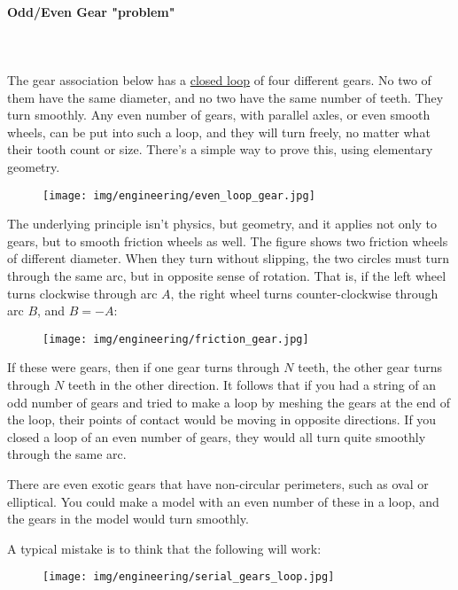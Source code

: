 	\paragraph{Odd/Even Gear "problem"}\mbox{}\\\\
	The gear association below has a \underline{closed loop} of four different gears. No two of them have the same diameter, and no two have the same number of teeth. They turn smoothly. Any even number of gears, with parallel axles, or even smooth wheels, can be put into such a loop, and they will turn freely, no matter what their tooth count or size. There's a simple way to prove this, using elementary geometry.
	\begin{figure}[H]
		\begin{center}
			\texttt{[image: img/engineering/even\_loop\_gear.jpg]}
		\end{center}	
	\end{figure}
	The underlying principle isn't physics, but geometry, and it applies not only to gears, but to smooth friction wheels as well. The figure shows two friction wheels of different diameter. When they turn without slipping, the two circles must turn through the same arc, but in opposite sense of rotation. That is, if the left wheel turns clockwise through arc $A$, the right wheel turns counter-clockwise through arc $B$, and $B = - A$:
	\begin{figure}[H]
		\begin{center}
			\texttt{[image: img/engineering/friction\_gear.jpg]}
		\end{center}	
	\end{figure}
	If these were gears, then if one gear turns through $N$ teeth, the other gear turns through $N$ teeth in the other direction. It follows that if you had a string of an odd number of gears and tried to make a loop by meshing the gears at the end of the loop, their points of contact would be moving in opposite directions. If you closed a loop of an even number of gears, they would all turn quite smoothly through the same arc.
	
	There are even exotic gears that have non-circular perimeters, such as oval or elliptical. You could make a model with an even number of these in a loop, and the gears in the model would turn smoothly.
	
	A typical mistake is to think that the following will work:
	\begin{figure}[H]
		\begin{center}
			\texttt{[image: img/engineering/serial\_gears\_loop.jpg]}
		\end{center}	
	\end{figure}
	
